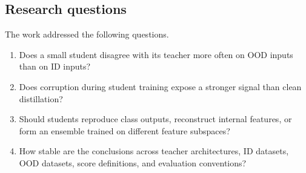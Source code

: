 \subsection{Research questions}

\headingindent
The work addressed the following questions.

\begin{enumerate}
    \item Does a small student disagree with its teacher more often on OOD
    inputs than on ID inputs?
    \item Does corruption during student training expose a stronger signal than clean distillation?
    \item Should students reproduce class outputs, reconstruct internal
    features, or form an ensemble trained on different feature subspaces?
    \item How stable are the conclusions across teacher architectures, ID
    datasets, OOD datasets, score definitions, and evaluation conventions?
\end{enumerate}

